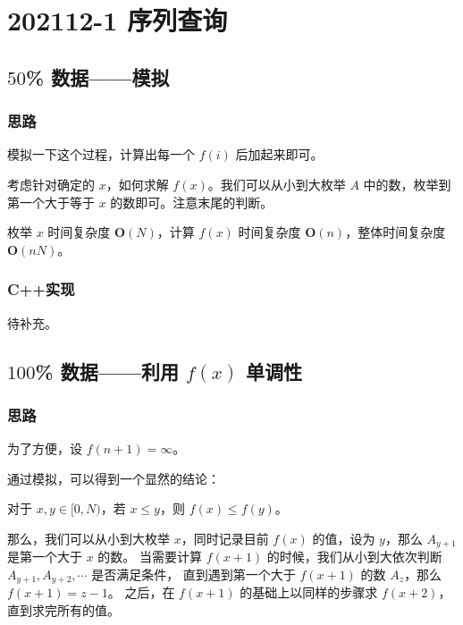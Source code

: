 \section{202112-1 序列查询}



\subsection{$50$\% 数据——模拟}

\subsubsection{思路}

模拟一下这个过程，计算出每一个 $f(i)$ 后加起来即可。

考虑针对确定的 $x$，如何求解 $f(x)$。我们可以从小到大枚举 $A$ 中的数，枚举到第一个大于等于 $x$ 的数即可。注意末尾的判断。

枚举 $x$ 时间复杂度 $\mathbf{O}(N)$，计算 $f(x)$ 时间复杂度 $\mathbf{O}(n)$，整体时间复杂度 $\mathbf{O}(nN)$。

\subsubsection{C++实现}

待补充。

\subsection{$100$\% 数据——利用 $f(x)$ 单调性}

\subsubsection{思路}

为了方便，设 $f(n+1) = \infty$。

通过模拟，可以得到一个显然的结论：

\begin{theorem}[$f(x)$的单调性] \label{thm:fx_monotonicity} 
  对于 $x,y\in [0,N)$，若 $x \le y$，则 $f(x) \le f(y)$。
\end{theorem}

那么，我们可以从小到大枚举 $x$，同时记录目前 $f(x)$ 的值，设为 $y$，那么 $A_{y+1}$ 是第一个大于 $x$ 的数。
当需要计算 $f(x+1)$ 的时候，我们从小到大依次判断 $A_{y+1},A_{y+2},\cdots$ 是否满足条件，
直到遇到第一个大于 $f(x+1)$ 的数 $A_z$，那么 $f(x+1)=z-1$。
之后，在 $f(x+1)$ 的基础上以同样的步骤求 $f(x+2)$，直到求完所有的值。

